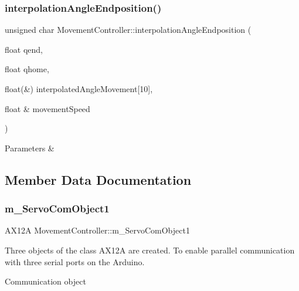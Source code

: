 \subsubsection{\texorpdfstring{interpolation\+Angle\+Endposition()}{interpolationAngleEndposition()}}
{\footnotesize\ttfamily unsigned char Movement\+Controller\+::interpolation\+Angle\+Endposition (\begin{DoxyParamCaption}\item[{float}]{qend,  }\item[{float}]{qhome,  }\item[{float(\&)}]{interpolated\+Angle\+Movement\mbox{[}10\mbox{]},  }\item[{float \&}]{movement\+Speed }\end{DoxyParamCaption})}


\begin{DoxyParams}{Parameters}
{\em } & \\
\hline
\end{DoxyParams}


\subsection{Member Data Documentation}
\mbox{\label{class_movement_controller_ac4642ac20e0affff60ff0b8c0e5efdbb}} 
\subsubsection{\texorpdfstring{m\+\_\+\+Servo\+Com\+Object1}{m\_ServoComObject1}}
{\footnotesize\ttfamily A\+X12A Movement\+Controller\+::m\+\_\+\+Servo\+Com\+Object1}



Three objects of the class A\+X12A are created. To enable parallel communication with three serial ports on the Arduino. 

Communication object \mbox{\label{class_movement_controller_abd74aff807ff311c6891311414ae3993}} 
